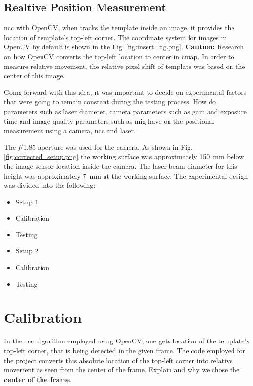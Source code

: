     \subsection*{Realtive Position Measurement}
        \gls{ncc} with OpenCV, when tracks the template inside an image, it provides the location of template's top-left corner. The coordinate system for images in OpenCV by default is shown in the Fig. \ref{fig:insert_fig.png}. \textbf{Caution:} Research on how OpenCV converts the top-left location to center in cmap. In order to measure relative movement, the relative pixel shift of template was based on the center of this image.

\vspace{5mm}

\noindent Going forward with this idea, it was important to decide on experimental factors that were going to remain constant during the testing process. How do parameters such as laser diameter, camera parameters such as gain and exposure time and image quality parameters such as \gls{mig} have on the positional measurement using a camera, \gls{ncc} and laser. 

\vspace{5mm}

\noindent The \emph{f}/1.85 aperture was used for the camera. As shown in Fig. \ref{fig:corrected_setup.png} the working surface was approximately \SI{150}{\milli\meter} below the image sensor location inside the camera. The laser beam diameter for this height was approximately \SI{7}{\milli\meter} at the working surface. The experimental design was divided into the following:
\begin{itemize}
    \item Setup 1
    \item Calibration
    \item Testing
    \item Setup 2
    \item Calibration
    \item Testing
\end{itemize}

\section{Calibration}
In the \gls{ncc} algorithm employed using OpenCV, one gets location of the template's top-left corner, that is being detected in the given frame. The code employed for the project converts this absolute location of the top-left corner into relative movement as seen from the center of the frame. Explain  and why we chose the \textbf{center of the frame}.


